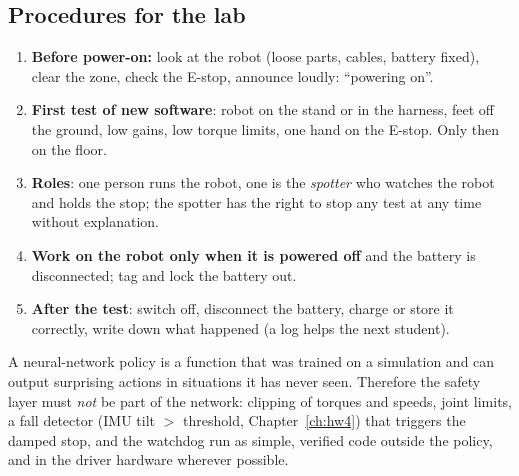 \subsection*{Procedures for the lab}
\begin{enumerate}[nosep]
\item \textbf{Before power-on:} look at the robot (loose parts, cables, battery fixed), clear the zone, check the E-stop, announce loudly: ``powering on''.
\item \textbf{First test of new software}: robot on the stand or in the harness, feet off the ground, low gains, low torque limits, one hand on the E-stop. Only then on the floor.
\item \textbf{Roles}: one person runs the robot, one is the \emph{spotter} who watches the robot and holds the stop; the spotter has the right to stop any test at any time without explanation.
\item \textbf{Work on the robot only when it is powered off} and the battery is disconnected; tag and lock the battery out.
\item \textbf{After the test}: switch off, disconnect the battery, charge or store it correctly, write down what happened (a log helps the next student).
\end{enumerate}
\begin{aibox}
A neural-network policy is a function that was trained on a simulation and can output surprising actions in situations it has never seen. Therefore the safety layer must \emph{not} be part of the network: clipping of torques and speeds, joint limits, a fall detector (IMU tilt $>$ threshold, Chapter~\ref{ch:hw4}) that triggers the damped stop, and the watchdog run as simple, verified code outside the policy, and in the driver hardware wherever possible.
\end{aibox}

